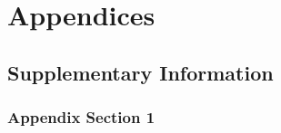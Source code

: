 \ctpartquote{}
\ctparttext{}
\part{Appendices}

\chapter{Supplementary Information}
\label{sec:supdata}

 \section{Appendix Section 1}
 \label{sec:appendix:sec1}

